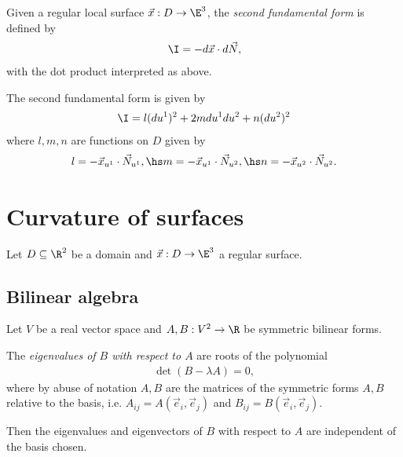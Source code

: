 \documentclass{article}
\begin{document}
\begin{definition}
    Given a regular local surface $\vec x: D\to\E^3$, the \emph{second fundamental form}
    is defined by 
    \begin{align*}
        \I = -d\vec x\cdot d\vec N,
    \end{align*}
    with the dot product interpreted as above.
\end{definition}

\begin{proposition}[Notes 7.17]
    The second fundamental form is given by
    \begin{align*}
        \I = l(du^1)^2 + 2mdu^1du^2+n(du^2)^2
    \end{align*}
    where $l,m,n$ are functions on $D$ given by
    \begin{align}
        \label{sff}
        l=-\vec x_{u^1}\cdot\vec N_{u^1}, \hs 
        m=-\vec x_{u^1}\cdot\vec N_{u^2}, \hs 
        n=-\vec x_{u^2}\cdot\vec N_{u^2}.
    \end{align}
\end{proposition}

\section{Curvature of surfaces}

Let $D\subseteq\R^2$ be a domain and $\vec x:D\to\E^3$ a regular surface.

\subsection{Bilinear algebra}

Let $V$ be a real vector space and $A,B:V^2\to\R$ be symmetric bilinear forms.

\begin{definition}
    The \emph{eigenvalues of $B$ with respect to $A$} are roots of the polynomial 
    \begin{align*}
        \det(B-\lambda A) = 0,
    \end{align*}
    where by abuse of notation $A,B$ are the matrices of the symmetric forms $A,B$ relative to the 
    basis, i.e. $A_{ij}=A(\vec e_i,\vec e_j)$ and $B_{ij}=B(\vec e_i,\vec e_j)$.
\end{definition}

\begin{lemma}[Notes 8.1]
    Then the eigenvalues and eigenvectors of $B$ with respect 
    to $A$ are independent of the basis chosen.
\end{lemma}
\end{document}
